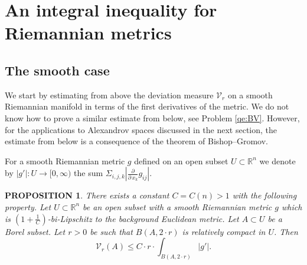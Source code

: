 \documentclass[12pt,leqno,intlimits]{amsart}
\numberwithin{equation}{section}
\newtheorem{prop}[thm]{PROPOSITION}
\theoremstyle{definition}
\newtheorem{defn}[thm]{Definition}%
\theoremstyle{remark}
\newcommand{\R}{\mathbb{R}}
\def\:{\colon}
\begin{document}




\section{An integral inequality for Riemannian metrics}\label{sec-BV-estimate}
\subsection{The smooth case} We start by estimating from above the deviation measure $\mathcal{V}_r$ on a smooth Riemannian manifold in terms of the first
derivatives of the metric. We do not know how to prove a similar estimate from below, see Problem \ref{qe:BV}. However, for the applications
to Alexandrov spaces discussed in the next section, the estimate from below is a consequence of the theorem of Bishop--Gromov.

For a smooth Riemannian metric $g$ defined on an open subset $U\subset \R^n$ we denote by $|g'|\:U\to [0,\infty)$ the sum $\Sigma_{i,j,k}|\frac \partial {\partial \,x_k} g_{ij}|$.


\begin{prop}\label{prop-smooth}
There exists a constant $C=C(n)>1$ with the following property.
Let $U\subset \R^n$ be an open subset with a smooth Riemannian
metric $g$ which is $(1+\frac 1 C)$-bi-Lipschitz to the background Euclidean metric.
Let $A\subset U$ be a Borel subset. Let $r>0$ be such that $B (A,{2{\cdot}r})$ is relatively compact in $U$.
Then
$$\mathcal{V}_r (A) \leq C \cdot r \cdot \int _{B ( A,{2{\cdot}r})} |g' |.$$
\end{prop}
\end{document}
